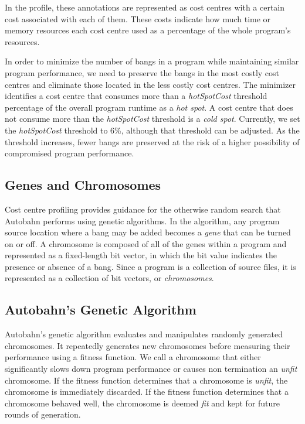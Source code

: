 \documentclass[format=sigplan]{acmart}
\newcommand{\hotspot}[0]{\textit{hot spot}}
\newcommand{\coldspot}[0]{\textit{cold spot}}
\newcommand{\hotspotcost}[0]{\textit{hotSpotCost}}
\newcommand{\unfit}[0]{\textit{unfit}}
\newcommand{\fit}[0]{\textit{fit}}
\begin{document}
In the profile, these annotations are represented as cost centres with a 
certain cost associated with each of them. These costs indicate how much
time or memory resources each cost centre used as a percentage of the
whole program's resources. 

In order to minimize the number of bangs in 
a program while maintaining similar program performance, we need to 
preserve the bangs in the most costly cost centres and eliminate those 
located in the less costly cost centres. The minimizer identifies a cost centre that consumes more than a \hotspotcost{} threshold percentage of the overall program runtime as a \hotspot{}. A cost centre that does not consume more than the \hotspotcost{} threshold is a \coldspot{}. Currently, we set the \hotspotcost{} threshold to 6\%, although that threshold can be
adjusted. As the threshold increases, fewer bangs
are preserved at the risk of a higher possibility of compromised program 
performance. 


\subsection{Genes and Chromosomes}

Cost centre profiling provides guidance for the otherwise random search 
that Autobahn performs using genetic algorithms. In the algorithm, any 
program source location where a bang may be added becomes a \textit{gene} that can 
be turned on or off. A chromosome is composed of all of the genes within a 
program and represented as a fixed-length bit vector, in which the bit value 
indicates the presence or absence of a bang. Since a program is a collection of source files, it is represented as a collection of bit vectors, or \textit{chromosomes}.

\subsection{Autobahn's Genetic Algorithm}

Autobahn's genetic algorithm evaluates and manipulates randomly generated chromosomes. It repeatedly generates new chromosomes before measuring their performance using a fitness function. We call a chromosome that either significantly slows down program performance or causes non termination an \unfit{} chromosome. If the fitness function determines that a chromosome is \unfit{}, the chromosome is immediately discarded. If the fitness function determines that a chromosome behaved well, the chromosome is deemed \fit{} and kept for future rounds of generation. 
\end{document}
